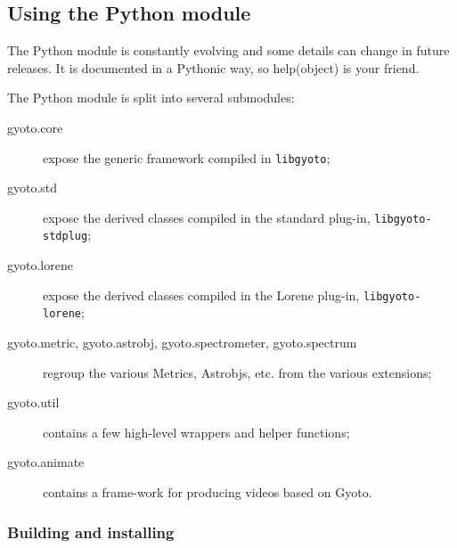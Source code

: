 \documentclass[a4paper,12pt]{article}
\begin{document}
\subsection{Using the Python module}
\label{sect:python}

The Python module is constantly evolving and some details can change
in future releases. It is documented in a Pythonic way, so
help(object) is your friend.

The Python module is split into several submodules:
\begin{description}
\item[gyoto.core] expose the generic framework compiled in
  \texttt{libgyoto};
\item[gyoto.std] expose the derived classes compiled in the
  standard plug-in, \texttt{libgyoto-stdplug};
\item[gyoto.lorene] expose the derived classes compiled in
  the Lorene plug-in, \texttt{libgyoto-lorene};
\item[gyoto.metric, gyoto.astrobj, gyoto.spectrometer, gyoto.spectrum]
  regroup the various Metrics, Astrobjs, etc. from the various
  extensions;
\item[gyoto.util] contains a few high-level wrappers and helper
  functions;
\item[gyoto.animate] contains a frame-work for producing videos based
  on Gyoto.
\end{description}

\subsubsection{Building and installing}
\end{document}
